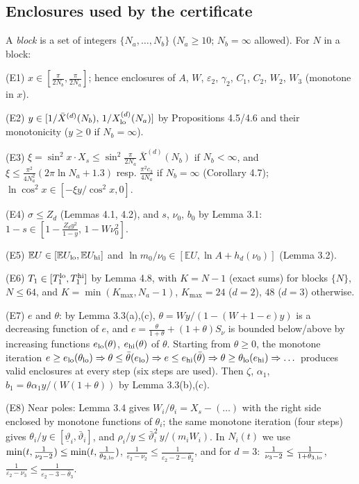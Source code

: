 \documentclass[11pt,a4paper]{article}
\theoremstyle{definition}
\theoremstyle{remark}
\begin{document}
\subsection{Enclosures used by the certificate}

A \emph{block} is a set of integers $\{N_a,\dots,N_b\}$ ($N_a\ge10$; $N_b=\infty$ allowed). For $N$ in a block:

(E1) $x\in[\frac{\pi}{2N_b},\frac{\pi}{2N_a}]$; hence enclosures of $A$, $W$, $\varepsilon_2$, $\gamma_2$, $C_1$, $C_2$, $W_2$, $W_3$ (monotone in $x$).

(E2) $y\in[1/\bar X^{(d)}(N_b),\,1/X^{(d)}_{\rm lo}(N_a)]$ by Propositions 4.5/4.6 and their monotonicity ($y\ge0$ if $N_b=\infty$).

(E3) $\xi=\sin^2x\cdot X_s\le\sin^2\frac{\pi}{2N_a}\,\bar X^{(d)}(N_b)$ if $N_b<\infty$, and $\xi\le\frac{\pi^2}{4N_a^2}(2\pi\ln N_a+1.3)$ resp. $\frac{\pi^2c_3}{4N_a}$ if $N_b=\infty$ (Corollary 4.7); $\ln\cos^2x\in[-\xi y/\cos^2x,0]$.

(E4) $\sigma\le Z_d$ (Lemmas 4.1, 4.2), and $s$, $\nu_0$, $b_0$ by Lemma 3.1: $1-s\in[1-\frac{Z_dy^2}{1-y},\,1-W\nu_0^2]$.

(E5) $\mathbb EU\in[\mathbb EU_{\rm lo},\mathbb EU_{\rm hi}]$ and $\ln m_0/\nu_0\in[\mathbb EU,\ln A+h_d(\nu_0)]$ (Lemma 3.2).

(E6) $T_1\in[T_1^{\rm lo},T_1^{\rm hi}]$ by Lemma 4.8, with $K=N-1$ (exact sums) for blocks $\{N\}$, $N\le64$, and $K=\min(K_{\max},N_a-1)$, $K_{\max}=24$ ($d=2$), $48$ ($d=3$) otherwise.

(E7) $e$ and $\theta$: by Lemma 3.3(a),(c), $\theta=Wy/(1-(W+1-e)y)$ is a decreasing function of $e$, and $e=\frac\theta{1+\theta}+(1+\theta)S_\nu$ is bounded below/above by increasing functions $e_{\rm lo}(\theta)$, $e_{\rm hi}(\theta)$ of $\theta$. Starting from $\theta\ge0$, the monotone iteration $e\ge e_{\rm lo}(\theta_{\rm lo})\Rightarrow\theta\le\bar\theta(e_{\rm lo})\Rightarrow e\le e_{\rm hi}(\bar\theta)\Rightarrow\theta\ge\theta_{\rm lo}(e_{\rm hi})\Rightarrow\dots$ produces valid enclosures at every step (six steps are used). Then $\zeta$, $\alpha_1$, $b_1=\theta\alpha_1y/(W(1+\theta))$ by Lemma 3.3(b),(c).

(E8) Near poles: Lemma 3.4 gives $W_i/\theta_i=X_s-(\dots)$ with the right side enclosed by monotone functions of $\theta_i$; the same monotone iteration (four steps) gives $\theta_i/y\in[\underline\vartheta_i,\bar\vartheta_i]$, and $\rho_i/y\le\bar\vartheta_i^2\,y/(m_iW_i)$. In $N_i(t)$ we use $\min(t,\frac1{\nu_2-2})\le\min(t,\frac{1}{\theta_{2,{\rm lo}}})$, $\frac{1}{\varepsilon_2-\nu_2}\le\frac1{\varepsilon_2-2-\bar\theta_2}$, and for $d=3$: $\frac1{\nu_3-2}\le\frac{1}{1+\theta_{3,\rm lo}}$, $\frac1{\varepsilon_2-\nu_3}\le\frac{1}{\varepsilon_2-3-\bar\theta_3}$.
\end{document}
